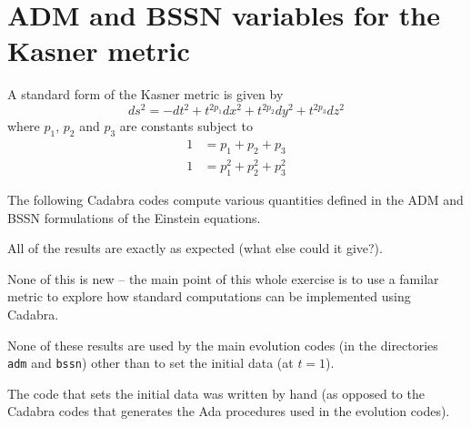 \documentclass[12pt]{cdblatex}
\begin{document}
\section*{ADM and BSSN variables for the Kasner metric}

A standard form of the Kasner metric is given by
\begin{equation*}
   ds^2 = - dt^2 + t^{2p_1} dx^2 + t^{2p_2} dy^2 + t^{2p_3} dz^2
\end{equation*}
where $p_1$, $p_2$ and $p_3$ are constants subject to
\begin{align*}
   1 &= p_1 + p_2 + p_3\\
   1 &= p^2_1 + p^2_2 + p^2_3
\end{align*}

The following Cadabra codes compute various quantities defined in the ADM and BSSN
formulations of the Einstein equations.

All of the results are exactly as expected (what else could it give?).

None of this is new -- the main point of this whole exercise is to use a familar metric
to explore how standard computations can be implemented using Cadabra.

None of these results are used by the main evolution codes (in the directories {\tt
adm} and {\tt bssn}) other than to set the initial data (at $t=1$).

The code that sets the initial data was written by hand (as opposed to the Cadabra
codes that generates the Ada procedures used in the evolution codes).

\clearpage
\end{document}

